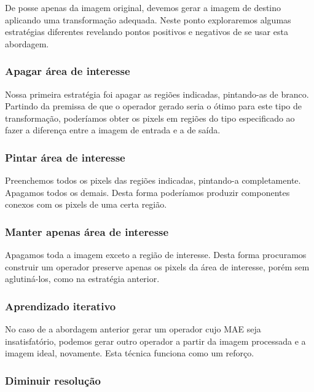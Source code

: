 \documentclass[a4paper,11pt]{article}
\begin{document}

      De posse apenas da imagem original, devemos gerar a imagem de destino aplicando uma transformação adequada. Neste ponto exploraremos algumas estratégias diferentes revelando pontos positivos e negativos de se usar esta abordagem.

      \subsubsection{Apagar área de interesse}

        Nossa primeira estratégia foi apagar as regiões indicadas, pintando-as de branco. Partindo da premissa de que o operador gerado seria o ótimo para este tipo de transformação, poderíamos obter os pixels em regiões do tipo especificado ao fazer a diferença entre a imagem de entrada e a de saída.

      \subsubsection{Pintar área de interesse}

        Preenchemos todos os pixels das regiões indicadas, pintando-a completamente. Apagamos todos os demais. Desta forma poderíamos produzir componentes conexos com os pixels de uma certa região.

      \subsubsection{Manter apenas área de interesse}

        Apagamos toda a imagem exceto a região de interesse. Desta forma procuramos construir um operador preserve apenas os pixels da área de interesse, porém sem aglutiná-los, como na estratégia anterior.

      \subsubsection{Aprendizado iterativo}

        No caso de a abordagem anterior gerar um operador cujo MAE seja insatisfatório, podemos gerar outro operador a partir da imagem processada e a imagem ideal, novamente. Esta técnica funciona como um reforço.

      \subsubsection{Diminuir resolução}
\end{document}
